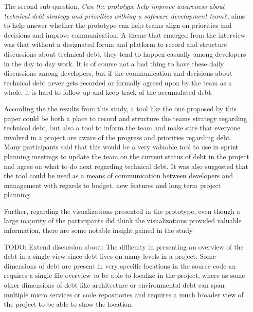 The second sub-question, \textit{Can the prototype help improve awareness about technical debt strategy and priorities withing a software development team?}, aims to help answer whether the prototype can help teams align on priorities and decisions and improve communication.
A theme that emerged from the interview was that without a designated forum and platform to record and structure discussions about technical debt, they tend to happen casually among developers in the day to day work.
It is of course not a bad thing to have these daily discussions among developers, but if the communication and decisions about technical debt never gets recorded or formally agreed upon by the team as a whole, it is hard to follow up and keep track of the accumulated debt.

According the the results from this study, a tool like the one proposed by this paper could be both a place to record and structure the teams strategy regarding technical debt, but also a tool to inform the team and make sure that everyone involved in a project are aware of the progress and priorities regarding debt.
Many participants said that this would be a very valuable tool to use in sprint planning meetings to update the team on the current status of debt in the project and agree on what to do next regarding technical debt.
It was also suggested that the tool could be used as a means of communication between developers and management with regards to budget, new features and long term project planning.

Further, regarding the visualizations presented in the prototype, even though a large majority of the participants did think the visualizations provided valuable information, there are some notable insight gained in the study 

TODO: Extend discussion about: The difficulty in presenting an overview of the debt in a single view since debt lives on many levels in a project. Some dimensions of debt are present in very specific locations in the source code an requires a single file overview to be able to localize in the project, where as some other dimensions of debt like architecture or environmental debt can span multiple micro services or code repositories and requires a much broader view of the project to be able to show the location.



